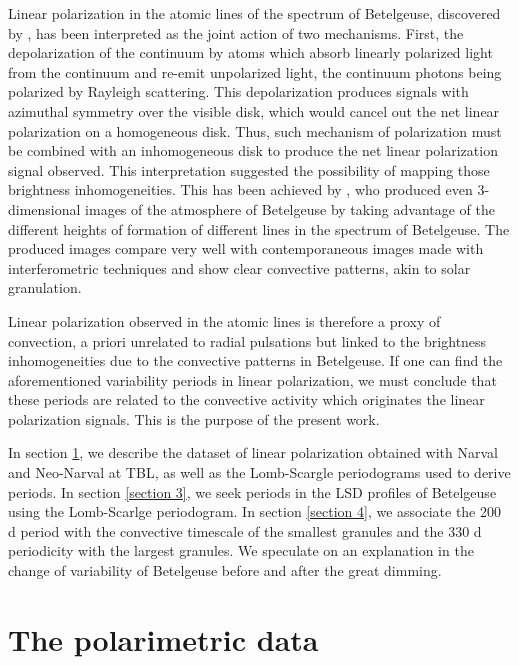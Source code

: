\documentclass{aa}
\begin{document}
Linear polarization in the atomic lines of the spectrum of Betelgeuse, discovered by \cite{auriere_discovery_2016}, has been interpreted as the joint action of 
two mechanisms. First, the depolarization of the continuum by atoms which absorb linearly polarized light from the continuum and re-emit unpolarized light,
the continuum photons being polarized by Rayleigh scattering. This depolarization produces signals with azimuthal symmetry over the visible disk, which would  cancel out the net linear polarization on a homogeneous disk. Thus, such mechanism of polarization must be combined with an inhomogeneous disk to produce the net linear polarization 
signal observed. This interpretation suggested the possibility of mapping those brightness inhomogeneities. This has been achieved by \cite{lopez_ariste_convective_2018}, who produced even 3-dimensional images of the atmosphere of Betelgeuse \citep{lopez_ariste_three-dimensional_2022} by taking advantage of the different heights of formation of 
different lines in the spectrum of Betelgeuse. The produced images compare very well with contemporaneous images made with interferometric 
techniques \citep{montarges_close_2016} and show clear convective patterns, akin to solar granulation.\

Linear polarization observed in the atomic lines is therefore a proxy of convection, a priori unrelated to radial 
pulsations but linked to the brightness inhomogeneities due to the convective patterns in Betelgeuse. If one can find the aforementioned variability periods 
in linear polarization, we must conclude that these periods are related to the convective activity which originates the linear polarization signals.
This is the purpose of the present work.\

In section \ref{Section 2}, we describe the dataset of linear polarization obtained with Narval and Neo-Narval at TBL, as well as the Lomb-Scargle periodograms used to derive periods. In section \ref{section 3}, we seek periods in the LSD profiles of Betelgeuse using the Lomb-Scarlge periodogram. In section \ref{section 4}, we associate the 200 d period with the convective timescale of the smallest granules and the 330 d periodicity with the largest granules. We speculate on an explanation in the change of variability of Betelgeuse before and after the great dimming. 


\section{The polarimetric data}
\label{Section 2}
\end{document}
